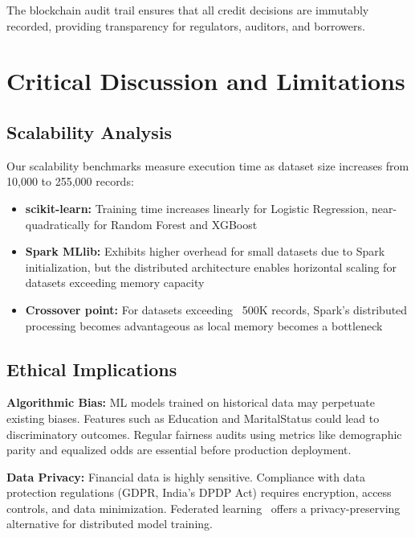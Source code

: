 \documentclass[runningheads]{llncs}
\begin{document}
The blockchain audit trail ensures that all credit decisions are immutably recorded, providing transparency for regulators, auditors, and borrowers.



\section{Critical Discussion and Limitations}
\label{sec:discussion}

\subsection{Scalability Analysis}

Our scalability benchmarks measure execution time as dataset size increases from 10,000 to 255,000 records:
\begin{itemize}
    \item \textbf{scikit-learn:} Training time increases linearly for Logistic Regression, near-quadratically for Random Forest and XGBoost
    \item \textbf{Spark MLlib:} Exhibits higher overhead for small datasets due to Spark initialization, but the distributed architecture enables horizontal scaling for datasets exceeding memory capacity
    \item \textbf{Crossover point:} For datasets exceeding ~500K records, Spark's distributed processing becomes advantageous as local memory becomes a bottleneck
\end{itemize}

\subsection{Ethical Implications}

\textbf{Algorithmic Bias:} ML models trained on historical data may perpetuate existing biases. Features such as Education and MaritalStatus could lead to discriminatory outcomes. Regular fairness audits using metrics like demographic parity and equalized odds are essential before production deployment.

\textbf{Data Privacy:} Financial data is highly sensitive. Compliance with data protection regulations (GDPR, India's DPDP Act) requires encryption, access controls, and data minimization. Federated learning~\cite{yang2019federated} offers a privacy-preserving alternative for distributed model training.
\end{document}
